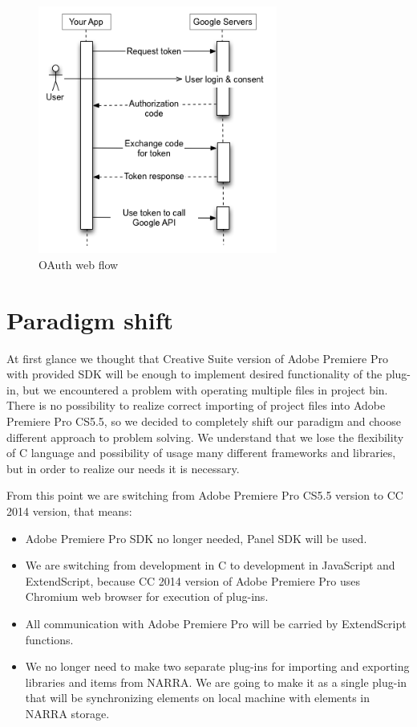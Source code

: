 \documentclass[thesis=B,english]{FITthesis}[2012/10/20]
\begin{document}
	\begin{figure}
		\centering
		\includegraphics[width=0.7\textwidth]{oauthwebflow.png}
		\caption{OAuth web flow}\label{fig:oauth}
	\end{figure}
\section{Paradigm shift}
At first glance we thought that Creative Suite version of Adobe Premiere Pro with provided SDK will be enough to implement desired functionality of the plug-in, but we encountered a problem with operating multiple files in project bin. There is no possibility to realize correct importing of project files into Adobe Premiere Pro CS5.5, so we decided to completely shift our paradigm and choose different approach to problem solving. We understand that we lose the flexibility of C language and possibility of usage many different frameworks and libraries, but in order to realize our needs it is necessary.

From this point we are switching from Adobe Premiere Pro CS5.5 version to CC 2014 version, that means:
	\begin{itemize}
		\item Adobe Premiere Pro SDK no longer needed, Panel SDK will be used.
		\item We are switching from development in C to development in JavaScript and ExtendScript, because CC 2014 version of Adobe Premiere Pro uses Chromium web browser for execution of plug-ins.
		\item All communication with Adobe Premiere Pro will be carried by ExtendScript functions.
		\item We no longer need to make two separate plug-ins for importing and exporting libraries and items from NARRA. We are going to make it as a single plug-in that will be synchronizing elements on local machine with elements in NARRA storage. 
	\end{itemize}
\end{document}

